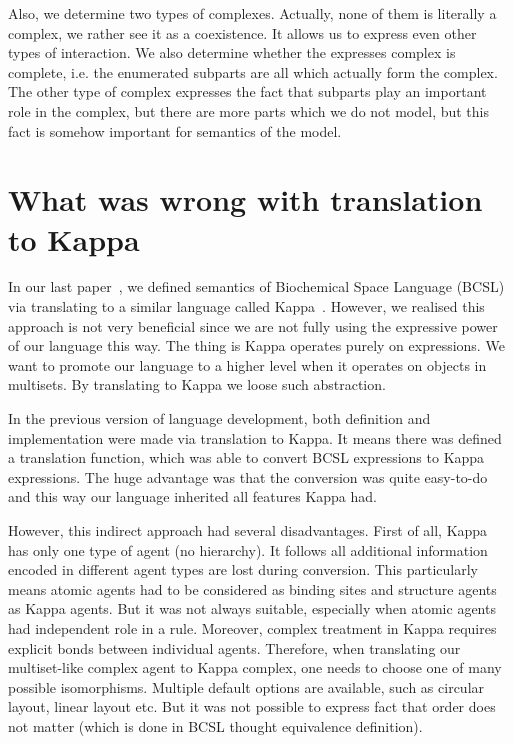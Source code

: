 \documentclass[12pt]{fithesis2}
\begin{document}
Also, we determine two types of complexes. Actually, none of them is literally a complex, we rather see it as a coexistence. It allows us to express even other types of interaction. We also determine whether the expresses complex is complete, i.e. the enumerated subparts are all which actually form the complex. The other type of complex expresses the fact that subparts play an important role in the complex, but there are more parts which we do not model, but this fact is somehow important for semantics of the model.

\section{What was wrong with translation to Kappa}
\label{why_not_kappa}

In our last paper~\cite{Ded201627}, we defined semantics of Biochemical Space Language (BCSL) via translating to a similar language called Kappa~\cite{kappa_formal}. However, we realised this approach is not very beneficial since we are not fully using the expressive power of our language this way. The thing is Kappa operates purely on expressions. We want to promote our language to a higher level when it operates on objects in multisets. By translating to Kappa we loose such abstraction. 

In the previous version of language development, both definition and implementation were made via translation to Kappa. It means there was defined a translation function, which was able to convert BCSL expressions to Kappa expressions. The huge advantage was that the conversion was quite easy-to-do and this way our language inherited all features Kappa had.

However, this indirect approach had several disadvantages. First of all, Kappa has only one type of agent (no hierarchy). It follows all additional information encoded in different agent types are lost during conversion. This particularly means atomic agents had to be considered as binding sites and structure agents as Kappa agents. But it was not always suitable, especially when atomic agents had independent role in a rule. Moreover, complex treatment in Kappa requires explicit bonds between individual agents. Therefore, when translating our multiset-like complex agent to Kappa complex, one needs to choose one of many possible isomorphisms. Multiple default options are available, such as circular layout, linear layout etc. But it was not possible to express fact that order does not matter (which is done in BCSL thought equivalence definition).
\end{document}
